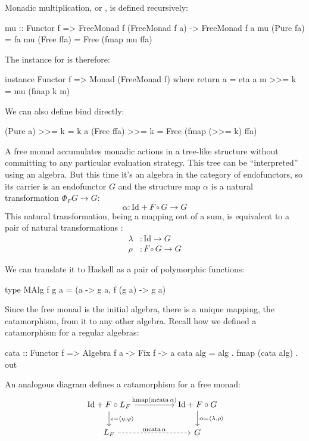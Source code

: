 \documentclass[DaoFP]{subfiles}
\begin{document}
Monadic multiplication, or , is defined recursively:
\begin{haskell}
mu :: Functor f => FreeMonad f (FreeMonad f a) -> FreeMonad f a
mu (Pure fa) = fa
mu (Free ffa) = Free (fmap mu ffa)
\end{haskell}

The  instance for  is therefore:
\begin{haskell}
instance Functor f => Monad (FreeMonad f) where
  return a = eta a
  m >>= k = mu (fmap k m)
\end{haskell}

We can also define bind directly:
\begin{haskell}
  (Pure a)   >>= k = k a
  (Free ffa) >>= k = Free (fmap (>>= k) ffa)
\end{haskell}

A free monad accumulates monadic actions in a tree-like structure without committing to any particular evaluation strategy. This tree can be ``interpreted'' using an algebra. But this time it's an algebra in the category of endofunctors, so its carrier is an endofunctor $G$ and the structure map $\alpha$ is a natural transformation $\Phi_F G \to G$:
\[ \alpha \colon \text{Id} + F \circ G \to G\]
This natural transformation, being a mapping out of a sum, is equivalent to a pair of natural transformations :
\begin{align*}
\lambda &\colon \text{Id} \to G
\\
\rho &\colon F \circ G \to G
\end{align*}

We can translate it to Haskell as a pair of polymorphic functions:
\begin{haskell}
type MAlg f g a = (a -> g a, f (g a) -> g a)
\end{haskell}

Since the free monad is the initial algebra, there is a unique mapping, the catamorphism, from it to any other algebra. Recall how we defined a catamorphism for a regular algebras:
\begin{haskell}
cata :: Functor f => Algebra f a -> Fix f -> a
cata alg = alg . fmap (cata alg) . out
\end{haskell}

An analogous diagram defines a catamorphism for a free monad:
\[
 \begin{tikzcd}
 \text{Id} + F \circ L_F
 \arrow[rr, "{\text{hmap} (\text{mcata}\, \alpha)}"]
 \arrow[d, "{\iota = \langle \eta, \varphi \rangle}"]
 && \text{Id} + F \circ G
\arrow[d, "{\alpha = \langle \lambda, \rho \rangle}"]
 \\
 L_F
 \arrow[rr, dashed, "\text{mcata}\, \alpha"]
 && G
  \end{tikzcd}
\]
\end{document}
